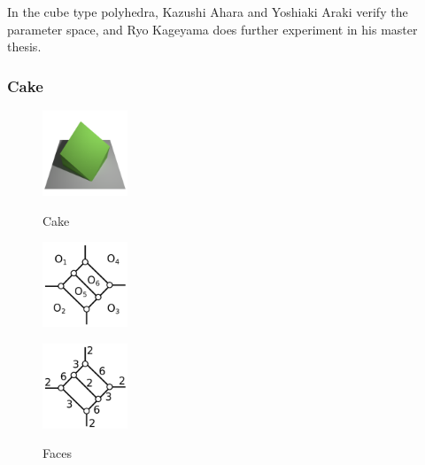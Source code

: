 \documentclass[suppldata, dvipdfmx]{interact}
\theoremstyle{plain}%
\theoremstyle{definition}
\theoremstyle{remark}
\theoremstyle{problemstyle}
\begin{document}
In the cube type polyhedra, Kazushi Ahara and Yoshiaki Araki
verify the parameter space, and Ryo Kageyama does further experiment in
his master thesis\cite{kageyama}. 

\subsubsection{Cake}

\begin{figure}[h!tbp]
  \begin{minipage}[t]{0.16\textwidth}
   \centering
   \includegraphics[width=1in, keepaspectratio]{./img/HexahedraWithSphericalFaces/hexahedralCake/cake.png}
   \caption{Cake}
   \label{fig:cake}
  \end{minipage}
 \hspace*{\fill}
  \begin{minipage}[t]{0.16\textwidth}
   \centering
   \includegraphics[width=1in, keepaspectratio]{./img/HexahedraWithSphericalFaces/hexahedralCake/hexahedralCakeFaces.png}
   \caption{Faces}
   \label{}
  \end{minipage}
 \hspace*{\fill}
 \begin{minipage}[t]{0.6\textwidth}
  \begin{minipage}[t]{0.19\textwidth}
   \centering
   \includegraphics[width=1in,
   keepaspectratio]{./img/HexahedraWithSphericalFaces/hexahedralCake/hexahedralCake_a.png}
   \subcaption{}
   \label{}
  \end{minipage}
  \hspace*{\fill}
  \begin{minipage}[t]{0.19\textwidth}

\end{minipage}
\end{minipage}
\end{figure}
\end{document}
